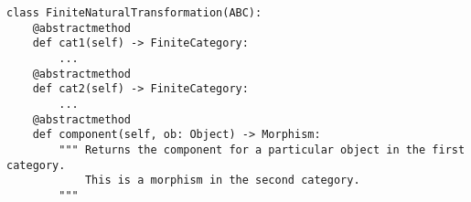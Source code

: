 \begin{verbatim}
class FiniteNaturalTransformation(ABC):
    @abstractmethod
    def cat1(self) -> FiniteCategory:
        ...
    @abstractmethod
    def cat2(self) -> FiniteCategory:
        ...
    @abstractmethod
    def component(self, ob: Object) -> Morphism:
        """ Returns the component for a particular object in the first category.
            This is a morphism in the second category.
        """
\end{verbatim}